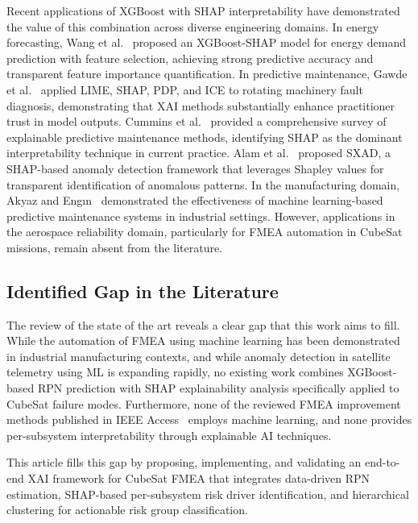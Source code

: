 Recent applications of XGBoost with SHAP interpretability have demonstrated the value of this combination across diverse engineering domains. In energy forecasting, Wang et al.~\cite{wang2025xgboostshap} proposed an XGBoost-SHAP model for energy demand prediction with feature selection, achieving strong predictive accuracy and transparent feature importance quantification. In predictive maintenance, Gawde et al.~\cite{gawde2024explainable} applied LIME, SHAP, PDP, and ICE to rotating machinery fault diagnosis, demonstrating that XAI methods substantially enhance practitioner trust in model outputs. Cummins et al.~\cite{cummins2024explainable} provided a comprehensive survey of explainable predictive maintenance methods, identifying SHAP as the dominant interpretability technique in current practice. Alam et al.~\cite{alam2024sxad} proposed SXAD, a SHAP-based anomaly detection framework that leverages Shapley values for transparent identification of anomalous patterns. In the manufacturing domain, Akyaz and Eng{\i}n~\cite{akyaz2024predictive} demonstrated the effectiveness of machine learning-based predictive maintenance systems in industrial settings. However, applications in the aerospace reliability domain, particularly for FMEA automation in CubeSat missions, remain absent from the literature.

\subsection{Identified Gap in the Literature}
\label{subsec:gap}

The review of the state of the art reveals a clear gap that this work aims to fill. While the automation of FMEA using machine learning has been demonstrated in industrial manufacturing contexts, and while anomaly detection in satellite telemetry using ML is expanding rapidly, no existing work combines XGBoost-based RPN prediction with SHAP explainability analysis specifically applied to CubeSat failure modes. Furthermore, none of the reviewed FMEA improvement methods published in IEEE Access~\cite{amwrpn2018,geomean_fmea2019,aadfmea2023} employs machine learning, and none provides per-subsystem interpretability through explainable AI techniques.

This article fills this gap by proposing, implementing, and validating an end-to-end XAI framework for CubeSat FMEA that integrates data-driven RPN estimation, SHAP-based per-subsystem risk driver identification, and hierarchical clustering for actionable risk group classification.
